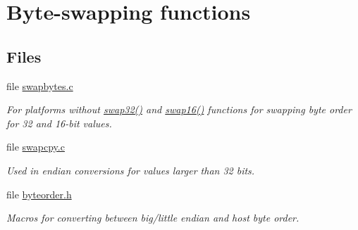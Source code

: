 \hypertarget{group__util__byteorder}{}\section{Byte-\/swapping functions}
\label{group__util__byteorder}
\subsection*{Files}
\begin{DoxyCompactItemize}
\item 
file \hyperlink{swapbytes_8c}{swapbytes.\+c}
\begin{DoxyCompactList}\small\item\em For platforms without \hyperlink{group__hal__hcs08_ga5bdbc60a02db00841f567d1ade52f877}{swap32()} and \hyperlink{group__hal__hcs08_ga490209526172903494641bdac55db46e}{swap16()} functions for swapping byte order for 32 and 16-\/bit values. \end{DoxyCompactList}\item 
file \hyperlink{swapcpy_8c}{swapcpy.\+c}
\begin{DoxyCompactList}\small\item\em Used in endian conversions for values larger than 32 bits. \end{DoxyCompactList}\item 
file \hyperlink{byteorder_8h}{byteorder.\+h}
\begin{DoxyCompactList}\small\item\em Macros for converting between big/little endian and host byte order. \end{DoxyCompactList}\end{DoxyCompactItemize}
